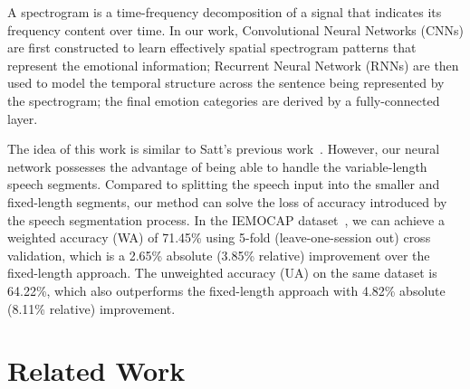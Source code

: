 \documentclass[a4paper]{article}
\begin{document}
A spectrogram is a time-frequency decomposition of a signal that indicates its frequency content over time. In our work, Convolutional Neural Networks (CNNs) are first constructed to learn effectively spatial spectrogram patterns that represent the emotional information; Recurrent Neural Network (RNNs) are then used to model the temporal structure across the sentence being represented by the spectrogram; the final emotion categories are derived by a fully-connected layer.

The idea of this work is similar to Satt's previous work~\cite{satt2017}. However, our neural network possesses the advantage of being able to handle the variable-length speech segments. Compared to splitting the speech input into the smaller and fixed-length segments, our method can solve the loss of accuracy introduced by the speech segmentation process. In the IEMOCAP dataset~\cite{busso2008}, we can achieve a weighted accuracy (WA) of 71.45\% using 5-fold (leave-one-session out) cross validation, which is a 2.65\% absolute (3.85\% relative) improvement over the fixed-length approach. The unweighted accuracy (UA) on the same dataset is 64.22\%, which also outperforms the fixed-length approach with 4.82\% absolute (8.11\% relative) improvement.


\section{Related Work}
\label{sec:related_work}

\end{document}
